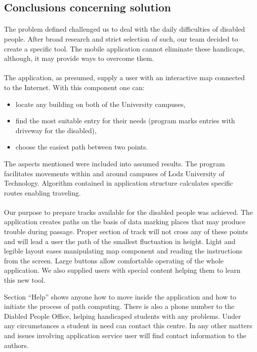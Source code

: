 \documentclass[12pt]{article}
\begin{document}
\subsection{Conclusions concerning solution}
\paragraph{}
The problem defined challenged us to deal with the daily difficulties of disabled people.
After broad research and strict selection of such, our team decided to create a specific tool.
The mobile application cannot eliminate these handicaps, although, it may provide ways to overcome them.

\paragraph{}
The application, as presumed, supply a user with an interactive map connected to the Internet.
With this component one can:
\begin{itemize}
	\item locate any building on both of the University campuses,
	\item find the most suitable entry for their needs (program marks entries with driveway for the disabled),
	\item choose the easiest path between two points.
\end{itemize}
The aspects mentioned were included into assumed results.
The program facilitates movements within and around campuses of Lodz University of Technology.
Algorithm contained in application structure calculates specific routes enabling traveling.

\paragraph{}
Our purpose to prepare tracks available for the disabled people was achieved.
The application creates paths on the basis of data marking places that may produce trouble during passage.
Proper section of track will not cross any of these points and will lead a user the path of the smallest fluctuation in height.
Light and legible layout eases manipulating map component and reading the instructions from the screen.
Large buttons allow comfortable operating of the whole application.
We also supplied users with special content helping them to learn this new tool.

Section ``Help'' shows anyone how to move inside the application and how to initiate the process of path computing.
There is also a phone number to the Diabled People Office, helping handicaped students with any problems.
Under any circumstances a student in need can contact this centre.
In any other matters and issues involving application service user will find contact information to the authors.
\end{document}
